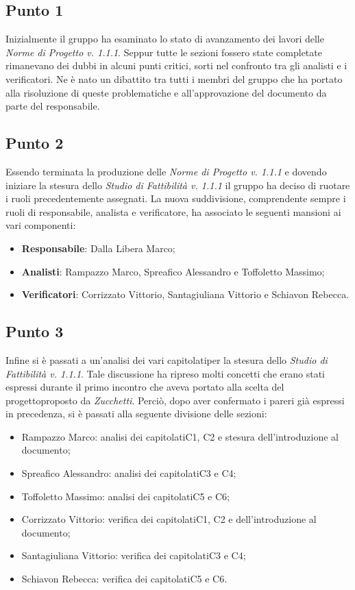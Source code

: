     \subsection{Punto 1}
        Inizialmente il gruppo ha esaminato lo stato di avanzamento dei lavori delle \textit{Norme di Progetto v. 1.1.1}. Seppur tutte le sezioni fossero state completate rimanevano dei dubbi in alcuni punti critici, sorti nel confronto tra gli analisti e i verificatori. Ne è nato un dibattito tra tutti i membri del gruppo che ha portato alla risoluzione di queste problematiche e all'approvazione del documento da parte del responsabile.
    \subsection{Punto 2}
        Essendo terminata la produzione delle \textit{Norme di Progetto v. 1.1.1} e dovendo iniziare la stesura dello \textit{Studio di Fattibilità v. 1.1.1} il gruppo ha deciso di ruotare i ruoli precedentemente assegnati. La nuova suddivisione, comprendente sempre i ruoli di responsabile, analista e verificatore, ha associato le seguenti mansioni ai vari componenti:
        \begin{itemize}
            \item \textbf{Responsabile}: Dalla Libera Marco;
            \item \textbf{Analisti}: Rampazzo Marco, Spreafico Alessandro e Toffoletto Massimo;
            \item \textbf{Verificatori}: Corrizzato Vittorio, Santagiuliana Vittorio e Schiavon Rebecca.
        \end{itemize}
    \subsection{Punto 3}
        Infine si è passati a un'analisi dei vari capitolati\glosp per la stesura dello \textit{Studio di Fattibilità v. 1.1.1}. Tale discussione ha ripreso molti concetti che erano stati espressi durante il primo incontro che aveva portato alla scelta del progetto\glosp proposto da \textit{Zucchetti}. Perciò, dopo aver confermato i pareri già espressi in precedenza, si è passati alla seguente divisione delle sezioni:
        \begin{itemize}
            \item Rampazzo Marco: analisi dei capitolati\glosp C1, C2 e stesura dell'introduzione al documento;
            \item Spreafico Alessandro: analisi dei capitolati\glosp C3 e C4;
            \item Toffoletto Massimo: analisi dei capitolati\glosp C5 e C6;
            \item Corrizzato Vittorio: verifica dei capitolati\glosp C1, C2 e dell'introduzione al documento;
            \item Santagiuliana Vittorio: verifica dei capitolati\glosp C3 e C4;
            \item Schiavon Rebecca: verifica dei capitolati\glosp C5 e C6.
        \end{itemize}